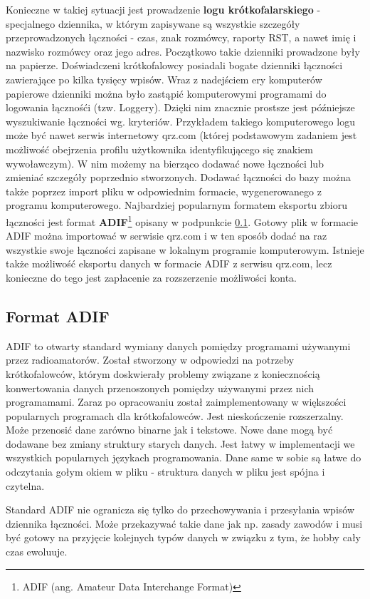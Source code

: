 \documentclass[]{mgr}
\begin{document}
        Konieczne w takiej sytuacji jest prowadzenie \textbf{logu krótkofalarskiego} - specjalnego dziennika, w którym zapisywane są wszystkie szczegóły przeprowadzonych łączności - czas, znak rozmówcy, raporty RST, a nawet imię i nazwisko rozmówcy oraz jego adres. Początkowo takie dzienniki prowadzone były na papierze. Doświadczeni krótkofalowcy posiadali bogate dzienniki łączności zawierające po kilka tysięcy wpisów. Wraz z nadejściem ery komputerów papierowe dzienniki można było zastąpić komputerowymi programami do logowania łącznośći (tzw. Loggery). Dzięki nim znacznie prostsze jest późniejsze wyszukiwanie łączności wg. kryteriów. Przykładem takiego komputerowego logu może być nawet serwis internetowy qrz.com (której podstawowym zadaniem jest możliwość obejrzenia profilu użytkownika identyfikującego się znakiem wywoławczym). W nim możemy na bierząco dodawać nowe łączności lub zmieniać szczegóły poprzednio stworzonych. Dodawać łączności do bazy można także poprzez import pliku w odpowiednim formacie, wygenerowanego z programu komputerowego. Najbardziej popularnym formatem eksportu zbioru łączności jest format \textbf{ADIF}\footnote{ADIF (ang. Amateur Data Interchange Format)} opisany w podpunkcie \ref{sec:adif}. Gotowy plik w formacie ADIF można importować w serwisie qrz.com i w ten sposób dodać na raz wszystkie swoje łączności zapisane w lokalnym programie komputerowym. Istnieje także możliwość eksportu danych w formacie ADIF z serwisu qrz.com, lecz konieczne do tego jest zapłacenie za rozszerzenie możliwości konta.
            \subsection{Format ADIF}
            \label{sec:adif}
            ADIF to otwarty standard wymiany danych pomiędzy programami używanymi przez radioamatorów. Został stworzony w odpowiedzi na potrzeby krótkofalowców, którym doskwierały problemy związane z koniecznością konwertowania danych przenoszonych pomiędzy używanymi przez nich programamami. Zaraz po opracowaniu został zaimplementowany w większości popularnych programach dla krótkofalowców. Jest nieskończenie rozszerzalny. Może przenosić dane zarówno binarne jak i tekstowe. Nowe dane mogą być dodawane bez zmiany struktury starych danych. Jest łatwy w implementacji we wszystkich popularnych językach programowania. Dane same w sobie są łatwe do odczytania gołym okiem w pliku - struktura danych w pliku jest spójna i czytelna.

            Standard ADIF nie ogranicza się tylko do przechowywania i przesyłania wpisów dziennika łączności. Może przekazywać takie dane jak np. zasady zawodów i musi być gotowy na przyjęcie kolejnych typów danych w związku z tym, że hobby cały czas ewoluuje.
\end{document}
